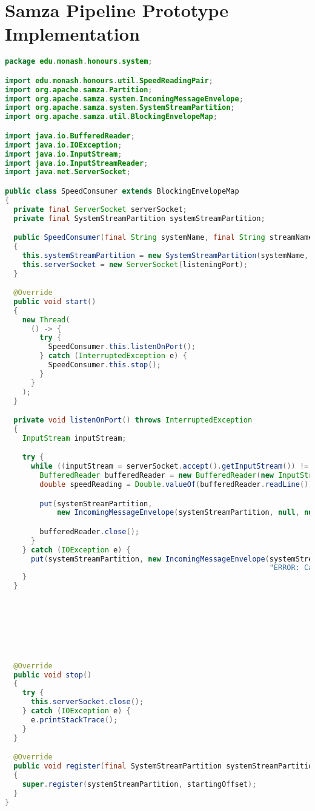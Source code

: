 \chapter{Samza Pipeline Prototype Implementation}
\begin{lstlisting}[language=java,caption=edu.monash.honours.system.SpeedConsumer (Java),label=samza-speedconsumersystem]
package edu.monash.honours.system;

import edu.monash.honours.util.SpeedReadingPair;
import org.apache.samza.Partition;
import org.apache.samza.system.IncomingMessageEnvelope;
import org.apache.samza.system.SystemStreamPartition;
import org.apache.samza.util.BlockingEnvelopeMap;

import java.io.BufferedReader;
import java.io.IOException;
import java.io.InputStream;
import java.io.InputStreamReader;
import java.net.ServerSocket;

public class SpeedConsumer extends BlockingEnvelopeMap
{
  private final ServerSocket serverSocket;
  private final SystemStreamPartition systemStreamPartition;

  public SpeedConsumer(final String systemName, final String streamName, final int listeningPort) throws IOException
  {
    this.systemStreamPartition = new SystemStreamPartition(systemName, streamName, new Partition((0)));
    this.serverSocket = new ServerSocket(listeningPort);
  }

  @Override
  public void start()
  {
    new Thread(
      () -> {
        try {
          SpeedConsumer.this.listenOnPort();
        } catch (InterruptedException e) {
          SpeedConsumer.this.stop();
        }
      }
    );
  }

  private void listenOnPort() throws InterruptedException
  {
    InputStream inputStream;

    try {
      while ((inputStream = serverSocket.accept().getInputStream()) != null) {
        BufferedReader bufferedReader = new BufferedReader(new InputStreamReader(inputStream));
        double speedReading = Double.valueOf(bufferedReader.readLine());

        put(systemStreamPartition,
            new IncomingMessageEnvelope(systemStreamPartition, null, null, new SpeedReadingPair(speedReading, false)));

        bufferedReader.close();
      }
    } catch (IOException e) {
      put(systemStreamPartition, new IncomingMessageEnvelope(systemStreamPartition, null, null,
                                                             "ERROR: Cannot read from port" + e.getMessage()));
    }
  }







  @Override
  public void stop()
  {
    try {
      this.serverSocket.close();
    } catch (IOException e) {
      e.printStackTrace();
    }
  }

  @Override
  public void register(final SystemStreamPartition systemStreamPartition, final String startingOffset)
  {
    super.register(systemStreamPartition, startingOffset);
  }
}
\end{lstlisting}

